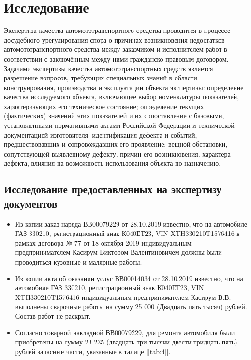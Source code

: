 \section{Исследование}
%
Экспертиза качества автомототранспортного средства проводится в процессе досудебного урегулирования спора о причинах возникновения недостатков автомототранспортного средства между заказчиком и  исполнителем работ в соответствии  с заключённым между ними гражданско-правовым договором.
Задачами экспертизы качества автомототранспортных средств является разрешение вопросов, требующих специальных знаний в области конструирования, производства и эксплуатации объекта экспертизы: определение качества исследуемого объекта, включающее выбор номенклатуры показателей, характеризующих его техническое состояние; определение текущих (фактических) значений этих показателей и их сопоставление с базовыми, установленными нормативными актами Российской Федерации и технической документацией изготовителя; идентификация дефекта и событий, предшествовавших и сопровождавших его проявление; вещной обстановки, сопутствующей выявленному дефекту, причин его возникновения, характера дефекта, влияния на возможность использования объекта по назначению.

\subsection{Исследование предоставленных на экспертизу документов}

\begin{itemize}
	\item Из копии заказ-наряда  ВВ00079229 от 28.10.2019 известно, что на автомобиле ГАЗ 330210, регистрационный знак К040ЕТ23, VIN XTH330210T1576416 в рамках договора № 77 от 18 октября 2019 индивидуальным предпринимателем Касирум Виктором Валентиновичем должны были  проводиться кузовные и малярные работы.
	\item Из копии акта об оказании услуг ВВ00014034 от 28.10.2019 известно, что на автомобиле ГАЗ 330210, регистрационный знак К040ЕТ23, VIN XTH330210T1576416 индивидуальным предпринимателем Касирум В.В. выполнены сварочные работы на сумму 25 000 (Двадцать пять тысяч) рублей. Состав работ не раскрыт. 
	\item Согласно товарной накладной ВВ00079229, для ремонта автомобиля были приобретены на сумму 23 235 (двадцать три тысячи двести тридцать пять) рублей	запасные части, указанные в талице [\ref{tab:4}].
\end{itemize}


